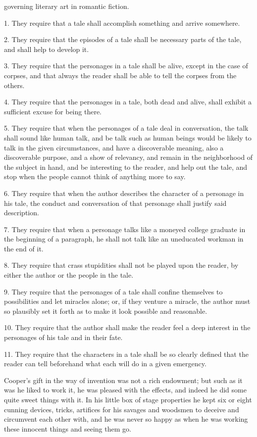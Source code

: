 \documentclass{novelette}
\begin{document}
 governing literary art in romantic fiction.

1. They require that a tale shall accomplish something and arrive somewhere.

2. They require that the episodes of a tale shall be necessary parts of
the tale, and shall help to develop it.

3. They require that the personages in a tale shall be alive, except in
the case of corpses, and that always the reader shall be able to tell
the corpses from the others.

4. They require that the personages in a tale, both dead and alive,
shall exhibit a sufficient excuse for being there.

5. They require that when the personages of a tale deal in conversation,
the talk shall sound like human talk, and be talk such as human
beings would be likely to talk in the given circumstances, and have
a discoverable meaning, also a discoverable purpose, and a show of
relevancy, and remain in the neighborhood of the subject in hand, and
be interesting to the reader, and help out the tale, and stop when the
people cannot think of anything more to say.

6. They require that when the author describes the character of a
personage in his tale, the conduct and conversation of that personage
shall justify said description.

7. They require that when a personage talks like a moneyed college graduate
in the beginning of a paragraph, he shall not talk like an uneducated workman
in the end of it.

8. They require that crass stupidities shall not be played upon the
reader, by either the author or the people in the tale.

9. They require that the personages of a tale shall confine themselves
to possibilities and let miracles alone; or, if they venture a miracle,
the author must so plausibly set it forth as to make it look possible
and reasonable.

10. They require that the author shall make the reader feel a deep
interest in the personages of his tale and in their fate.

11. They require that the characters in a tale shall be so clearly
defined that the reader can tell beforehand what each will do in a given
emergency.


Cooper's gift in the way of invention was not a rich endowment; but
such as it was he liked to work it, he was pleased with the effects,
and indeed he did some quite sweet things with it. In his little box of
stage properties he kept six or eight cunning devices, tricks, artifices
for his savages and woodsmen to deceive and circumvent each other with,
and he was never so happy as when he was working these innocent things
and seeing them go.
\end{document}
